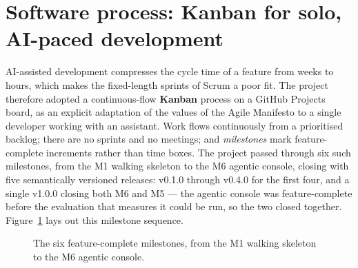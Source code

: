 \section{Software process: Kanban for solo, AI-paced development}
\label{sec:process}

AI-assisted development compresses the cycle time of a feature from weeks to hours,
which makes the fixed-length sprints of Scrum a poor fit. The
project therefore adopted a continuous-flow \textbf{Kanban} process
\cite{kanban_anderson} on a GitHub Projects board, as an explicit adaptation of the
values of the Agile Manifesto to a single developer working
with an assistant. Work flows continuously from a prioritised backlog; there are no
sprints and no meetings; and \emph{milestones} mark feature-complete increments
rather than time boxes. The project passed through six such milestones, from the M1
walking skeleton to the M6 agentic console, closing with five semantically
versioned releases: v0.1.0 through v0.4.0 for the first four, and a
single v1.0.0 closing both M6 and M5 --- the agentic console was feature-complete
before the evaluation that measures it could be run, so the two closed together.
Figure~\ref{fig:milestones} lays out this milestone sequence.

\begin{figure}[htbp]
\centering
{}
\caption[Milestone sequence of the project]{The six feature-complete milestones, from the
M1 walking skeleton to the M6 agentic console.}
\label{fig:milestones}
\end{figure}

